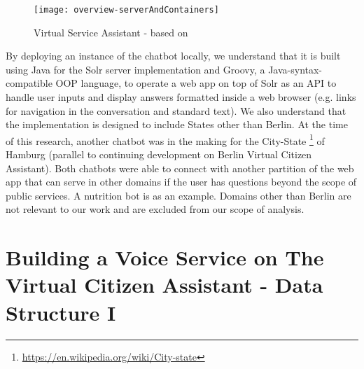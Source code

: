 %




\begin{wrapfigure}{l}{0.6\textwidth}
	\caption[Virtual Service Assistant Modules]{Virtual Service Assistant - based on \footnotemark }
	\label{vca:modules}
	\texttt{[image: overview-serverAndContainers]}
\end{wrapfigure}


By deploying an instance of the chatbot locally, we understand that it is built using Java for the Solr server implementation and Groovy, a Java-syntax-compatible OOP language, to operate a web app on top of Solr as an API to handle user inputs and display answers formatted inside a web browser (e.g. links for navigation in the conversation and standard text). We also understand that the implementation is designed to include States other than Berlin. At the time of this research, another chatbot was in the making for the City-State \footnote{\url{https://en.wikipedia.org/wiki/City-state}} of Hamburg (parallel to continuing development on Berlin Virtual Citizen Assistant). Both chatbots were able to connect with another partition of the web app that can serve in other domains if the user has questions beyond the scope of public services. A nutrition bot is as an example. Domains other than Berlin are not relevant to our work and are excluded from our scope of analysis.





\section[Data Structure I]{Building a Voice Service on The Virtual Citizen Assistant -  Data Structure I}


